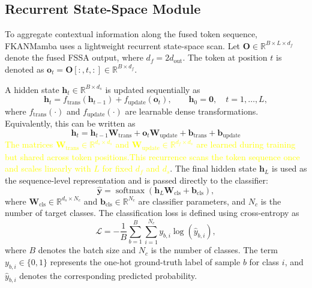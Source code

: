 \documentclass{ieeeaccess}
\begin{document}
\subsection{Recurrent State-Space Module}
\label{sec:ssm}

To aggregate contextual information along the fused token sequence, FKANMamba uses a lightweight recurrent state-space scan. Let
$\mathbf{O}\in\mathbb{R}^{B\times L\times d_f}$ denote the fused FSSA output, where $d_f=2d_{\mathrm{out}}$. The token at position $t$ is denoted as
$\mathbf{o}_{t}=\mathbf{O}[:,t,:]\in\mathbb{R}^{B\times d_f}$.

A hidden state $\mathbf{h}_{t}\in\mathbb{R}^{B\times d_s}$ is updated sequentially as
\begin{equation}
\mathbf{h}_{t}
=
f_{\mathrm{trans}}(\mathbf{h}_{t-1})
+
f_{\mathrm{update}}(\mathbf{o}_{t}),
\qquad
\mathbf{h}_{0}=\mathbf{0},
\quad
t=1,\ldots,L,
\label{eq:ssm_update_general}
\end{equation}
where $f_{\mathrm{trans}}(\cdot)$ and $f_{\mathrm{update}}(\cdot)$ are learnable dense transformations. Equivalently, this can be written as
\begin{equation}
\mathbf{h}_{t}
=
\mathbf{h}_{t-1}\mathbf{W}_{\mathrm{trans}}
+
\mathbf{o}_{t}\mathbf{W}_{\mathrm{update}}
+ \mathbf{b}_{\mathrm{trans}}
+
\mathbf{b}_{\mathrm{update}}
\label{eq:ssm_update}
\end{equation}
\textcolor{yellow}{
The matrices $\mathbf{W}_{\mathrm{trans}}\in\mathbb{R}^{d_s\times d_s}$ and $\mathbf{W}_{\mathrm{update}}\in\mathbb{R}^{d_f\times d_s}$ are learned during training but shared across token positions.This recurrence scans the token sequence once and scales linearly with $L$ for fixed $d_f$ and $d_s$}. The final hidden state $\mathbf{h}_{L}$ is used as the sequence-level representation and is passed directly to the classifier: 
\begin{equation}
\widehat{\mathbf{y}}
=
\operatorname{softmax}
\left(
\mathbf{h}_{L}\mathbf{W}_{\mathrm{cls}}
+
\mathbf{b}_{\mathrm{cls}}
\right),
\label{eq:ssm_softmax}
\end{equation}
where $\mathbf{W}_{\mathrm{cls}}\in\mathbb{R}^{d_s\times N_c}$ and
$\mathbf{b}_{\mathrm{cls}}\in\mathbb{R}^{N_c}$ are classifier parameters, and $N_c$ is the number of target classes. The classification loss is defined using cross-entropy as
\begin{equation}
\mathcal{L}
=
-\frac{1}{B}
\sum_{b=1}^{B}
\sum_{i=1}^{N_c}
y_{b,i}
\log
\left(
\widehat{y}_{b,i}
\right),
\label{eq:ce_loss}
\end{equation}
where $B$ denotes the batch size and ${N_c}$ is the number of classes. The term $y_{b,i}\in\{0,1\}$ represents the one-hot ground-truth label of sample $b$ for class $i$, and $\widehat{y}_{b,i}$ denotes the corresponding predicted probability.
\end{document}
